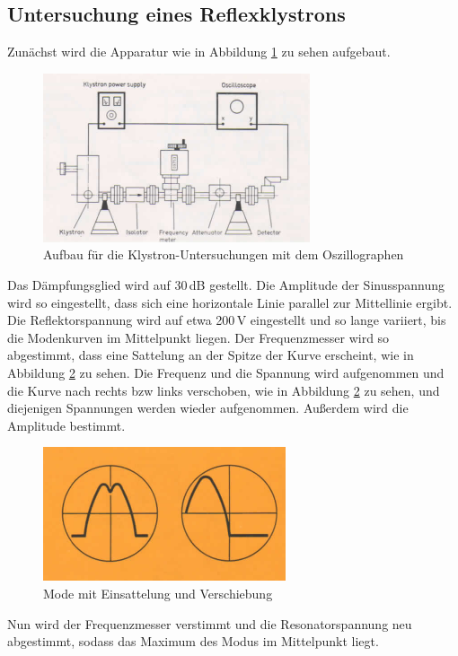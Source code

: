     \subsection{Untersuchung eines Reflexklystrons}
    Zunächst wird die Apparatur wie in Abbildung \ref{fig:Aufbauklystron} zu sehen aufgebaut.
    \begin{figure}
      \centering
      \includegraphics[scale = 0.8]{pictures/aufbauKlystron.png}
      \caption{Aufbau für die Klystron-Untersuchungen mit dem Oszillographen\cite{anleitung}}
      \label{fig:Aufbauklystron}
    \end{figure}
    Das Dämpfungsglied wird auf 30\,dB gestellt.
    Die Amplitude der Sinusspannung wird so eingestellt, dass sich eine horizontale Linie parallel zur Mittellinie ergibt.
    Die Reflektorspannung wird auf etwa 200\,V eingestellt und so lange variiert, bis die Modenkurven im Mittelpunkt liegen.
    Der Frequenzmesser wird so abgestimmt, dass eine Sattelung an der Spitze der Kurve erscheint, wie in Abbildung \ref{fig:Mode} zu sehen.
    Die Frequenz und die Spannung wird aufgenommen und die Kurve nach rechts bzw links verschoben,
    wie in Abbildung \ref{fig:Mode} zu sehen, und diejenigen Spannungen werden wieder aufgenommen.
    Außerdem wird die Amplitude bestimmt.
    \begin{figure}
      \centering
      \includegraphics[scale=0.8]{pictures/Mode.png}
      \caption{Mode mit Einsattelung und Verschiebung\cite{anleitung}}
      \label{fig:Mode}
    \end{figure}
    Nun wird der Frequenzmesser verstimmt und die Resonatorspannung neu abgestimmt,
    sodass das Maximum des Modus im Mittelpunkt liegt.
